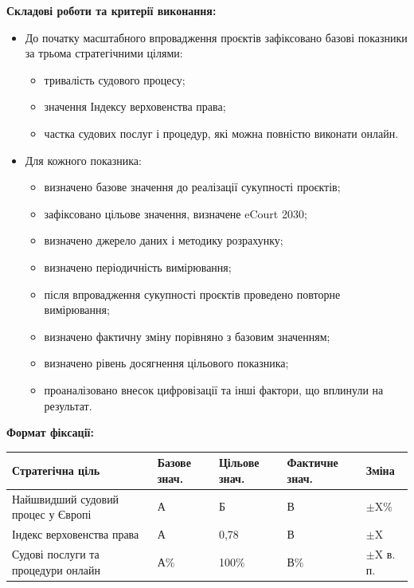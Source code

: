 \documentclass{article}
\begin{document}
\vspace{10pt}
\textbf{Складові роботи та критерії виконання:}
\begin{itemize}
    \item До початку масштабного впровадження проєктів зафіксовано базові показники за трьома стратегічними цілями:
    \begin{itemize}
        \item тривалість судового процесу;
        \item значення Індексу верховенства права;
        \item частка судових послуг і процедур, які можна повністю виконати онлайн.
    \end{itemize}
    \item Для кожного показника:
    \begin{itemize}
        \item визначено базове значення до реалізації сукупності проєктів;
        \item зафіксовано цільове значення, визначене eCourt 2030;
        \item визначено джерело даних і методику розрахунку;
        \item визначено періодичність вимірювання;
        \item після впровадження сукупності проєктів проведено повторне вимірювання;
        \item визначено фактичну зміну порівняно з базовим значенням;
        \item визначено рівень досягнення цільового показника;
        \item проаналізовано внесок цифровізації та інші фактори, що вплинули на результат.
    \end{itemize}
\end{itemize}

\vspace{10pt}
\textbf{Формат фіксації:}

\begin{longtable}{@{}p{5.5cm}p{2.2cm}p{2.2cm}p{2.2cm}p{2.2cm}@{}}
\toprule
\textbf{Стратегічна ціль} & \textbf{Базове знач.} & \textbf{Цільове знач.} & \textbf{Фактичне знач.} & \textbf{Зміна} \\
\midrule
Найшвидший судовий процес у Європі & А & Б & В & $\pm$X\% \\
\midrule
Індекс верховенства права & А & 0,78 & В & $\pm$X \\
\midrule
Судові послуги та процедури онлайн & А\% & 100\% & В\% & $\pm$X в. п. \\
\bottomrule
\end{longtable}
\end{document}
